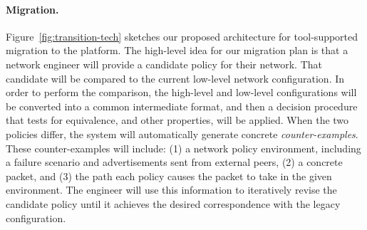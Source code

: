 \paragraph{Migration.}  Figure~\ref{fig:transition-tech} sketches our proposed architecture for tool-supported migration 
to the \Name platform.  The high-level idea for our migration plan is that a network engineer will
provide a candidate \Name policy for their network.  That candidate will be compared to
the current low-level network configuration.  In order to perform the comparison, the
high-level and low-level configurations will be converted into a common 
intermediate format, and then a decision procedure that tests for equivalence, and other properties, will be applied.
When the two policies differ, the system will automatically generate
concrete \emph{counter-examples}.  These counter-examples will
include: (1) a network policy environment, including a failure scenario and advertisements
sent from external peers, (2) a concrete packet, and (3) the path each policy causes the packet to take in the given environment.
The engineer will use this information to iteratively revise the 
candidate \Name policy until it achieves the desired correspondence with the legacy configuration.  

